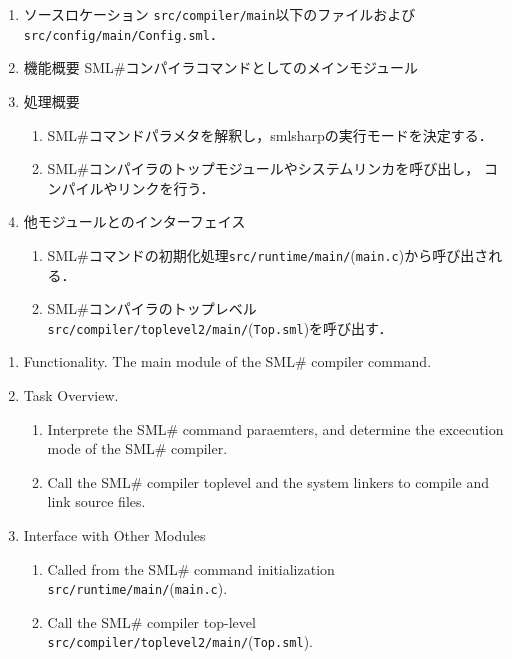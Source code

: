 \documentclass{jbook}
\newcommand{\smlsharp}{SML\#}
\newcommand{\code}[1]{\mbox{\large\tt #1}}
\newcommand{\module}[2]{\code{#1}(\code{#2})}
\begin{document}
\ifjp%
\begin{enumerate}
\item ソースロケーション
\code{src/compiler/main}以下のファイルおよび
\code{src/config/main/Config.sml}．

\item 機能概要
	\smlsharp{}コンパイラコマンドとしてのメインモジュール
\item 処理概要
\begin{enumerate}
\item \smlsharp{}コマンドパラメタを解釈し，smlsharp{}の実行モードを決定する．
\item \smlsharp{}コンパイラのトップモジュールやシステムリンカを呼び出し，
コンパイルやリンクを行う．
\end{enumerate}
\item 他モジュールとのインターフェイス
\begin{enumerate}
\item \smlsharp{}コマンドの初期化処理\module{src/runtime/main/}{main.c}から呼び出される．
\item \smlsharp{}コンパイラのトップレベル
\module{src/compiler/toplevel2/main/}{Top.sml}を呼び出す．
\end{enumerate}
\end{enumerate}
\else%
\begin{enumerate}
\item Functionality.
	The main module of the \smlsharp{} compiler command.
\item Task Overview.
\begin{enumerate}
\item Interprete the \smlsharp{} command paraemters, and  determine the
excecution mode of the \smlsharp{} compiler.
\item Call the \smlsharp{} compiler toplevel and the system linkers
to compile and link source files.
\end{enumerate}
\item Interface with Other Modules
\begin{enumerate}
\item Called from the \smlsharp{} command initialization \module{src/runtime/main/}{main.c}.
\item Call the \smlsharp{} compiler top-level
\module{src/compiler/toplevel2/main/}{Top.sml}.
\end{enumerate}
\end{enumerate}
\fi%
\end{document}
